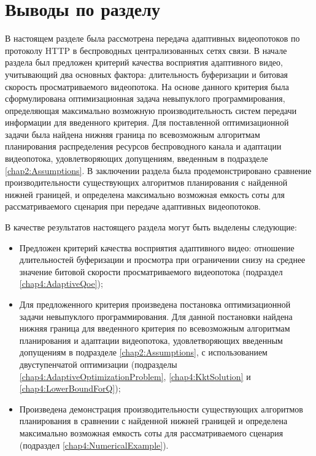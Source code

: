 \section{Выводы по разделу}

В настоящем разделе была рассмотрена передача адаптивных видеопотоков по протоколу HTTP в беспроводных централизованных сетях связи. В начале раздела был предложен критерий качества восприятия адаптивного видео, учитывающий два основных фактора: длительность буферизации и битовая скорость просматриваемого видеопотока. На основе данного критерия была сформулирована оптимизационная задача невыпуклого программирования, определяющая максимально возможную производительность систем передачи информации для введенного критерия. Для поставленной оптимизационной задачи была найдена нижняя граница по всевозможным алгоритмам планирования распределения ресурсов беспроводного канала и адаптации видеопотока, удовлетворяющих допущениям, введенным в подразделе \ref{chap2:Assumptions}. В заключении раздела была продемонстрировано сравнение производительности существующих алгоритмов планирования с найденной нижней границей, и определена максимально возможная емкость соты для рассматриваемого сценария при передаче адаптивных видеопотоков.

В качестве результатов настоящего раздела могут быть выделены следующие:
\begin{itemize}
	\item Предложен критерий качества восприятия адаптивного видео: отношение длительностей буферизации и просмотра при ограничении снизу на среднее значение битовой скорости просматриваемого видеопотока (подраздел \ref{chap4:AdaptiveQoe});
	\item Для предложенного критерия произведена постановка оптимизационной задачи невыпуклого программирования. Для данной постановки найдена нижняя граница для введенного критерия по всевозможным алгоритмам планирования и адаптации видеопотока, удовлетворяющих введенным допущениям в подразделе \ref{chap2:Assumptions}, с использованием двуступенчатой оптимизации (подразделы \ref{chap4:AdaptiveOptimizationProblem}, \ref{chap4:KktSolution} и \ref{chap4:LowerBoundForQ});
	\item Произведена демонстрация производительности существующих алгоритмов планирования в сравнении с найденной нижней границей и определена максимально возможная емкость соты для рассматриваемого сценария (подраздел \ref{chap4:NumericalExample}).
\end{itemize}

